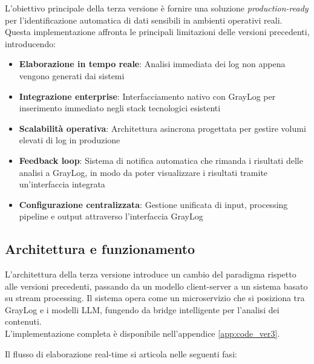 \documentclass[12pt]{report}
\begin{document}
L'obiettivo principale della terza versione è fornire una soluzione \textit{production-ready} per l'identificazione automatica di dati sensibili in ambienti operativi reali. Questa implementazione affronta le principali limitazioni delle versioni precedenti, introducendo:

\begin{itemize}
    \item \textbf{Elaborazione in tempo reale}: Analisi immediata dei log non appena vengono generati dai sistemi
    \item \textbf{Integrazione enterprise}: Interfacciamento nativo con GrayLog per inserimento immediato negli stack tecnologici esistenti
    \item \textbf{Scalabilità operativa}: Architettura asincrona progettata per gestire volumi elevati di log in produzione
    \item \textbf{Feedback loop}: Sistema di notifica automatica che rimanda i risultati delle analisi a GrayLog, in modo da poter visualizzare i risultati tramite un'interfaccia integrata
    \item \textbf{Configurazione centralizzata}: Gestione unificata di input, processing pipeline e output attraverso l'interfaccia GrayLog
\end{itemize}

\subsection{Architettura e funzionamento}
\label{subsec:ver3_architettura}

L'architettura della terza versione introduce un cambio del paradigma rispetto alle versioni precedenti, passando da un modello client-server a un sistema basato su stream processing. Il sistema opera come un microservizio che si posiziona tra GrayLog e i modelli LLM, fungendo da bridge intelligente per l'analisi dei contenuti. \\
L'implementazione completa è disponibile nell'appendice \ref{app:code_ver3}.

Il flusso di elaborazione real-time si articola nelle seguenti fasi:
\end{document}
